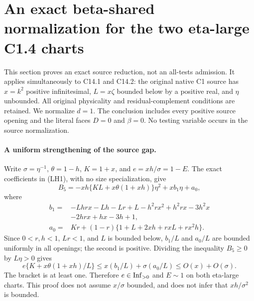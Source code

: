 \section{\texorpdfstring{An exact beta-shared normalization for the two eta-large C1.4 charts}{An exact beta-shared normalization for the two eta-large C1.4 charts}}
\label{component:p10ee3d96a3f1}

\label{p10ee3d96a3f1:sec:r8-c1-large-eta-source-normalization}
This section proves an exact source reduction, not an all-tests admission.
It applies simultaneously to C14.1 and C14.2: the original native C1
source has $x=k^2$ positive infinitesimal, $L=x\zeta$ bounded below by a
positive real, and $\eta$ unbounded. All original physicality and
residual-complement conditions are retained. We normalize $d=1$.
The conclusion includes every positive source opening and the literal
faces $D=0$ and $\beta=0$. No testing variable occurs in the source
normalization.

\paragraph{A uniform strengthening of the source gap.}
Write $\sigma=\eta^{-1}$, $\theta=1-h$, $K=1+x$, and
$e=xh/\sigma=1-E$. The exact coefficients in (LH1), with no size
specialization, give
\[
 B_5=-xh\{KL+x\theta(1+xh)\}\eta^2+x b_1\eta+a_0,
\]
where
\begin{align*}
 b_1={}&-Lhrx-Lh-Lr+L-h^2rx^2+h^2rx-3h^2x\\
 &-2hrx+hx-3h+1,\\
 a_0={}&Kr+(1-r)\{1+L+2xh+rxL+rx^2h\}.
\end{align*}
Since $0<r,h<1$, $Lr<1$, and $L$ is bounded below,
$b_1/L$ and $a_0/L$ are bounded uniformly in all openings; the second
is positive. Dividing the inequality $B_5\ge0$ by $L\eta>0$ gives
\[
 e\{K+x\theta(1+xh)/L\}
 \le x(b_1/L)+\sigma(a_0/L)\le O(x)+O(\sigma).
 \tag{BE1}
\]
The bracket is at least one. Therefore $e\in\operatorname{Inf}_{>0}$ and $E\sim1$
on both eta-large charts. This proof does not assume $x/\sigma$ bounded,
and does not infer that $xh/\sigma^2$ is bounded.

